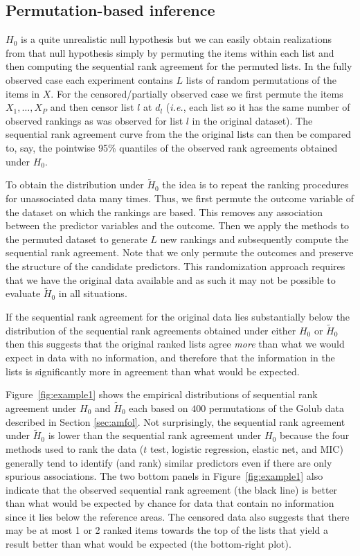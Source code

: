 \documentclass[12pt,a4paper]{article}
\makeatletter
\newcommand{\ie}{\emph{i.e.}\@\xspace}
\theoremstyle{plain}
\makeatother
\begin{document}
\subsection{Permutation-based inference}

$H_0$ is a quite unrealistic null hypothesis but we can easily obtain
realizations from that null hypothesis simply by permuting the items
within each list and then computing the sequential rank agreement for
the permuted lists. In the fully observed case each experiment
contains $L$ lists of random permutations of the items in $X$. For the
censored/partially observed case we first permute the items
$X_1,\dots,X_P$ and then censor list $l$ at $d_l$ (\ie, each list so
it has the same number of observed rankings as was observed for list
$l$ in the original dataset). The sequential rank agreement curve from
the the original lists can then be compared to, say, the pointwise
95\% quantiles of the observed rank agreements obtained under $H_0$.

To obtain the distribution under $\widetilde H_0$ the idea is to
repeat the ranking procedures for unassociated data many times.  Thus,
we first permute the outcome variable of the dataset on which the
rankings are based. This removes any association between the predictor
variables and the outcome. Then we apply the methods to the permuted
dataset to generate $L$ new rankings and subsequently compute the
sequential rank agreement. Note that we only permute the outcomes and
preserve the structure of the candidate predictors. This randomization
approach requires that we have the original data available and as such
it may not be possible to evaluate $\widetilde H_0$ in all situations.

If the sequential rank agreement for the original data lies
substantially below the distribution of the sequential rank agreements
obtained under either $H_0$ or $\widetilde H_0$ then this suggests that
the original ranked lists agree \emph{more} than what we would expect
in data with no information, and therefore that the information in the
lists is significantly more in agreement than what would be expected.

Figure~\ref{fig:example1} shows the empirical distributions of
sequential rank agreement under $H_0$ and $\widetilde H_0$ each based
on $400$ permutations of the Golub data described in Section
\ref{sec:amfol}. Not surprisingly, the sequential rank agreement under
$\widetilde H_0$ is lower than the sequential rank agreement under
$H_0$ because the four methods used to rank the data ($t$ test,
logistic regression, elastic net, and MIC) generally tend to identify
(and rank) similar predictors even if there are only spurious
associations. The two bottom panels in Figure~\ref{fig:example1} also
indicate that the observed sequential rank agreement (the black line)
is better than what would be expected by chance for data that contain
no information since it lies below the reference areas. The censored
data also suggests that there may be at most 1 or 2 ranked items
towards the top of the lists that yield a result better than what
would be expected (the bottom-right plot).
\end{document}
